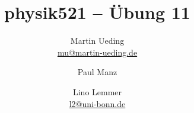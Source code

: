 

\title{physik521 – Übung 11}
\author{
	Martin Ueding \\ \small{\href{mailto:mu@martin-ueding.de}{mu@martin-ueding.de}}
        \and Paul Manz
        \and Lino Lemmer \\ \small{\href{mailto:l2@uni-bonn.de}{l2@uni-bonn.de}}
}

\pagestyle{plain}

\newcommand\kB{k_\text B}
\newcommand\muB{\mu_\text B}



\maketitle

\IfFileExists{\bibliographyfile}{
    \printbibliography
}{}




